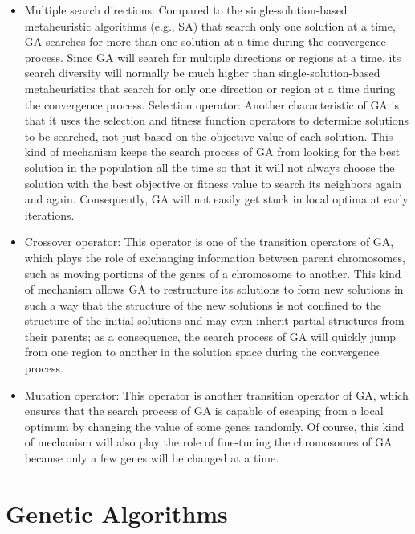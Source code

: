 \documentclass[
  letterpaper,
  DIV=11,
  numbers=noendperiod]{scrreprt}
\providecommand{\tightlist}{%
  \setlength{\itemsep}{0pt}\setlength{\parskip}{0pt}}\usepackage{longtable,booktabs,array}
\begin{document}
\begin{itemize}
\tightlist
\item
  Multiple search directions: Compared to the single-solution-based
  metaheuristic algorithms (e.g., SA) that search only one solution at a
  time, GA searches for more than one solution at a time during the
  convergence process. Since GA will search for multiple directions or
  regions at a time, its search diversity will normally be much higher
  than single-solution-based metaheuristics that search for only one
  direction or region at a time during the convergence process.
  Selection operator: Another characteristic of GA is that it uses the
  selection and fitness function operators to determine solutions to be
  searched, not just based on the objective value of each solution. This
  kind of mechanism keeps the search process of GA from looking for the
  best solution in the population all the time so that it will not
  always choose the solution with the best objective or fitness value to
  search its neighbors again and again. Consequently, GA will not easily
  get stuck in local optima at early iterations.
\item
  Crossover operator: This operator is one of the transition operators
  of GA, which plays the role of exchanging information between parent
  chromosomes, such as moving portions of the genes of a chromosome to
  another. This kind of mechanism allows GA to restructure its solutions
  to form new solutions in such a way that the structure of the new
  solutions is not confined to the structure of the initial solutions
  and may even inherit partial structures from their parents; as a
  consequence, the search process of GA will quickly jump from one
  region to another in the solution space during the convergence
  process.
\item
  Mutation operator: This operator is another transition operator of GA,
  which ensures that the search process of GA is capable of escaping
  from a local optimum by changing the value of some genes randomly. Of
  course, this kind of mechanism will also play the role of fine-tuning
  the chromosomes of GA because only a few genes will be changed at a
  time.
\end{itemize}


\chapter{Genetic Algorithms}\label{genetic-algorithms-2}
\end{document}

